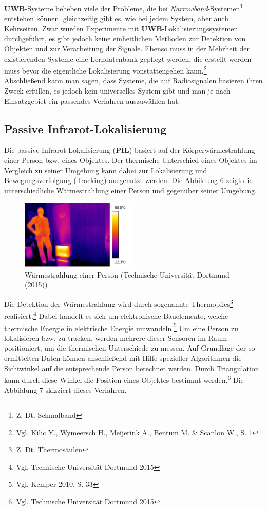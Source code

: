 \textbf{UWB}-Systeme beheben viele der Probleme, die bei \textit{Narrowband}-Systemen\footnote{Z. Dt. Schmalband} entstehen können, gleichzeitig gibt es, wie bei jedem System, aber auch Kehrseiten. Zwar wurden Experimente mit \textbf{UWB}-Lokalisierungssystemen durchgeführt, es gibt jedoch keine einheitlichen Methoden zur Detektion von Objekten und zur Verarbeitung der Signale. Ebenso muss in der Mehrheit der existierenden Systeme eine Lerndatenbank gepflegt werden, die erstellt werden muss bevor die eigentliche Lokalisierung vonstattengehen kann.\footnote{Vgl. Kilic Y., Wymeersch H., Meijerink A., Bentum M. \& Scanlon W., S. 1}\\
Abschließend kann man sagen, dass Systeme, die auf Radiosignalen basieren ihren Zweck erfüllen, es jedoch kein universelles System gibt und man je nach Einsatzgebiet ein passendes Verfahren auszuwählen hat.


\subsection{Passive Infrarot-Lokalisierung}
Die passive Infrarot-Lokalisierung (\textbf{PIL}) basiert auf der Körperwärmestrahlung einer Person bzw. eines Objektes. Der thermische Unterschied eines Objektes im Vergleich zu seiner Umgebung kann dabei zur Lokalisierung und Bewegungsverfolgung (Tracking) ausgenutzt werden. Die Abbildung 6 zeigt die unterschiedliche Wärmestrahlung einer Person und gegenüber seiner Umgebung.

\begin{figure}[H]
	\centering
	\includegraphics[width=0.5\textwidth]{pictures/pil1}
	\caption{Wärmestrahlung einer Person (Technische Universität Dortmund (2015))}
\end{figure}

Die Detektion der Wärmestrahlung wird durch sogenannte Thermopiles\footnote{Z. Dt. Thermosäulen}  realisiert.\footnote{Vgl. Technische Universität Dortmund 2015} Dabei handelt es sich um elektronische Bauelemente, welche thermische Energie in elektrische Energie umwandeln.\footnote{Vgl. Kemper 2010, S. 33} Um eine Person zu lokalisieren bzw. zu tracken, werden mehrere dieser Sensoren im Raum positioniert, um die thermischen Unterschiede zu messen. Auf Grundlage der so ermittelten Daten können anschließend mit Hilfe spezieller Algorithmen die Sichtwinkel auf die entsprechende Person berechnet werden. Durch Triangulation kann durch diese Winkel die Position eines Objektes bestimmt werden.\footnote{Vgl. Technische Universität Dortmund 2015} Die Abbildung 7 skizziert dieses Verfahren.

